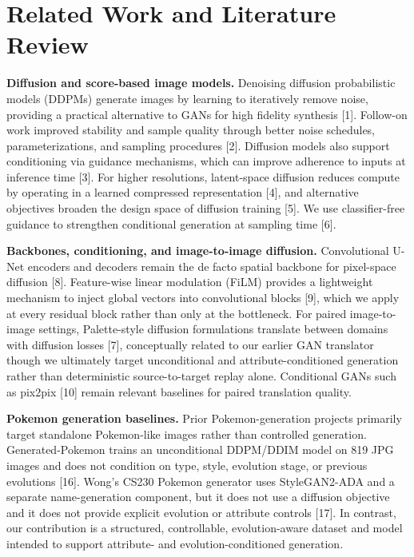 \documentclass[
]{article}
\begin{document}
\section{Related Work and Literature Review}\label{related-work-and-literature-review}

\textbf{Diffusion and score-based image models.} Denoising diffusion
probabilistic models (DDPMs) generate images by learning to iteratively
remove noise, providing a practical alternative to GANs for
high fidelity synthesis {[}1{]}. Follow-on work improved stability and
sample quality through better noise schedules, parameterizations, and
sampling procedures {[}2{]}. Diffusion models also support conditioning
via guidance mechanisms, which can improve adherence to inputs at
inference time {[}3{]}. For higher resolutions, latent-space diffusion
reduces compute by operating in a learned compressed representation
{[}4{]}, and alternative objectives broaden the design space of diffusion
training {[}5{]}. We use classifier-free guidance to strengthen
conditional generation at sampling time {[}6{]}.

\textbf{Backbones, conditioning, and image-to-image diffusion.}
Convolutional U-Net encoders and decoders remain the de facto spatial
backbone for pixel-space diffusion {[}8{]}. Feature-wise linear
modulation (FiLM) provides a lightweight mechanism to inject global
vectors into convolutional blocks {[}9{]}, which we apply at every
residual block rather than only at the bottleneck. For paired
image-to-image settings, Palette-style diffusion formulations translate
between domains with diffusion losses {[}7{]}, conceptually related to
our earlier GAN translator though we ultimately target unconditional and
attribute-conditioned generation rather than deterministic
source-to-target replay alone. Conditional GANs such as pix2pix {[}10{]}
remain relevant baselines for paired translation quality.

\textbf{Pokemon generation baselines.} Prior Pokemon-generation projects
primarily target standalone Pokemon-like images rather than controlled
generation. Generated-Pokemon trains an unconditional DDPM/DDIM model on
819 JPG images and does not condition on type, style, evolution stage, or
previous evolutions {[}16{]}. Wong's CS230 Pokemon generator uses
StyleGAN2-ADA and a separate name-generation component, but it does not
use a diffusion objective and it does not provide explicit evolution or
attribute controls {[}17{]}. In contrast, our contribution is a
structured, controllable, evolution-aware dataset and model intended to
support attribute- and evolution-conditioned generation.
\end{document}

